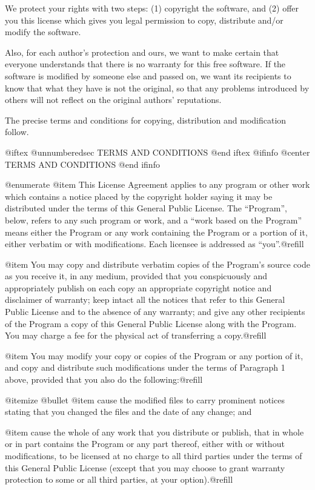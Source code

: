   We protect your rights with two steps: (1) copyright the software, and
(2) offer you this license which gives you legal permission to copy,
distribute and/or modify the software.

  Also, for each author's protection and ours, we want to make certain
that everyone understands that there is no warranty for this free
software.  If the software is modified by someone else and passed on, we
want its recipients to know that what they have is not the original, so
that any problems introduced by others will not reflect on the original
authors' reputations.

  The precise terms and conditions for copying, distribution and
modification follow.

@iftex
@unnumberedsec TERMS AND CONDITIONS
@end iftex
@ifinfo
@center TERMS AND CONDITIONS
@end ifinfo

@enumerate
@item
This License Agreement applies to any program or other work which
contains a notice placed by the copyright holder saying it may be
distributed under the terms of this General Public License.  The
``Program'', below, refers to any such program or work, and a ``work based
on the Program'' means either the Program or any work containing the
Program or a portion of it, either verbatim or with modifications.  Each
licensee is addressed as ``you''.@refill

@item
You may copy and distribute verbatim copies of the Program's source
code as you receive it, in any medium, provided that you conspicuously and
appropriately publish on each copy an appropriate copyright notice and
disclaimer of warranty; keep intact all the notices that refer to this
General Public License and to the absence of any warranty; and give any
other recipients of the Program a copy of this General Public License
along with the Program.  You may charge a fee for the physical act of
transferring a copy.@refill

@item
You may modify your copy or copies of the Program or any portion of
it, and copy and distribute such modifications under the terms of Paragraph
1 above, provided that you also do the following:@refill

@itemize @bullet
@item
cause the modified files to carry prominent notices stating that
you changed the files and the date of any change; and

@item
cause the whole of any work that you distribute or publish, that
in whole or in part contains the Program or any part thereof, either
with or without modifications, to be licensed at no charge to all
third parties under the terms of this General Public License (except
that you may choose to grant warranty protection to some or all
third parties, at your option).@refill

